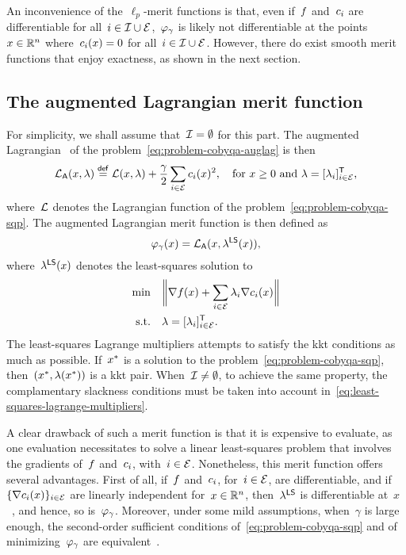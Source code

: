 An inconvenience of the~$\ell_p$-merit functions is that, even if~$f$ and~$c_{i}$ are differentiable for all~$i \in \mathcal{I} \cup \mathcal{E}$,~$\merit_{\gamma}$ is likely not differentiable at the points~$\iter \in \R^n$ where~$\con{i}(\iter) = 0$ for all~$i \in \mathcal{I} \cup \mathcal{E}$.
However, there do exist smooth merit functions that enjoy exactness, as shown in the next section.

\subsection{The augmented Lagrangian merit function}

For simplicity, we shall assume that~$\mathcal{I} = \emptyset$ for this part.
The augmented Lagrangian~\cite{Hestenes_1969,Powell_1969,Rockafellar_1973} of the problem~\cref{eq:problem-cobyqa-auglag} is then
\begin{equation*}
    \auglag(\iter, \lm) \eqdef \lag(\iter, \lm) + \frac{\gamma}{2} \sum_{i \in \ieq} \con{i}(\iter)^2, \quad \text{for~$\iter \ge 0$ and~$\lm = [\lm_i]_{i \in \ieq}^{\T}$,}
\end{equation*}
where~$\lag$ denotes the Lagrangian function of the problem~\cref{eq:problem-cobyqa-sqp}.
The augmented Lagrangian merit function is then defined as
\begin{equation*}
    \merit_{\gamma}(\iter) = \auglag(\iter, \lm[\mathsf{LS}](\iter)),
\end{equation*}
where~$\lm[\mathsf{LS}](\iter)$ denotes the least-squares solution to
\begin{subequations}
    \label{eq:least-squares-lagrange-multipliers}
    \begin{align}
        \min        & \quad \norm[\bigg]{\nabla \obj(\iter) + \sum_{i \in \ieq} \lm_i \nabla \con{i}(x)}\\
        \text{s.t.} & \quad \lm = [\lm_i]_{i \in \ieq}^{\T}.
    \end{align}
\end{subequations}
The least-squares Lagrange multipliers attempts to satisfy the \gls{kkt} conditions as much as possible.
If~$\iter[\ast]$ is a solution to the problem~\cref{eq:problem-cobyqa-sqp}, then~$(\iter[\ast], \lm(\iter[\ast]))$ is a \gls{kkt} pair.
When~$\mathcal{I} \neq \emptyset$, to achieve the same property, the complamentary slackness conditions must be taken into account in~\cref{eq:least-squares-lagrange-multipliers}.

A clear drawback of such a merit function is that it is expensive to evaluate, as one evaluation necessitates to solve a linear least-squares problem that involves the gradients of~$f$ and~$c_{i}$, with~$i \in \mathcal{E}$.
Nonetheless, this merit function offers several advantages.
First of all, if~$f$ and~$c_{i}$, for~$i \in \mathcal{E}$, are differentiable, and if~$\set{\nabla \con{i}(\iter)}_{i \in \ieq}$ are linearly independent for~$\iter \in \R^n$, then~$\lm[\mathsf{LS}]$ is differentiable at~$x$~\cite[Lem.~14.2.1]{Conn_Gould_Toint_2000}, and hence, so is~$\merit_{\gamma}$.
Moreover, under some mild assumptions, when~$\gamma$ is large enough, the second-order sufficient conditions of~\cref{eq:problem-cobyqa-sqp} and of minimizing~$\merit_{\gamma}$ are equivalent~\cite[Thm.~14.6.1]{Conn_Gould_Toint_2000}.

